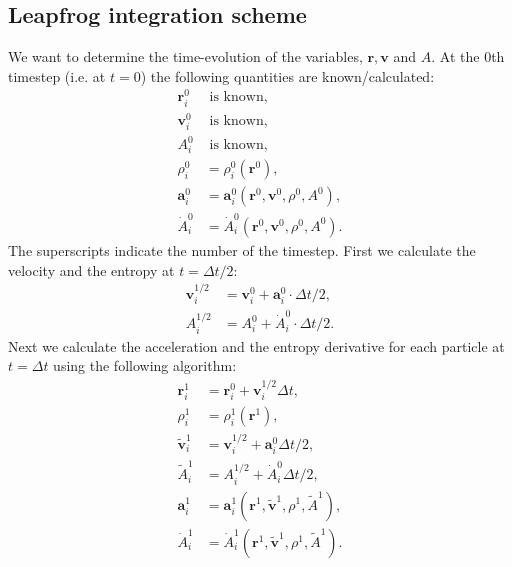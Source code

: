 \documentclass[11pt,a4paper]{article} %
\newcommand{\mb}[1]{\mathbf{#1}}
\begin{document}
\subsection*{Leapfrog integration scheme}
We want to determine the time-evolution of the variables, $\mb{r},\mb{v}$ and $A$. At the 0th timestep (i.e. at $t=0$) the following quantities are known/calculated:
\begin{align*}
\mb{r}_i^0 &\text{ is known},\\
\mb{v}_i^0&\text{ is known},\\
A_i^0&\text{ is known}, \\
\rho_i^0&=\rho_i^0 (\mb{r}^0), \\
\mb{a}_i^0 &= \mb{a}_i^0 (\mb{r}^0,\mb{v}^0,\rho^0 ,A^0 ),\\
\dot{A}_i^0 &= \dot{A}_i^0(\mb{r}^0,\mb{v}^0,\rho^0 ,A^0 ).
\end{align*}
The superscripts indicate the number of the timestep. First we calculate the velocity and the
entropy at $t=\Delta t/2$:
\begin{align*}
\mb{v}_i^{1/2} &= \mb{v}_i^0 + \mb{a}_i^0\cdot  \Delta t/2,\\
A_i^{1/2} &= A_i^{0}+ \dot{A}_i^{0}\cdot \Delta t/2 .
\end{align*}
Next we calculate the acceleration and the entropy derivative for each particle at $t=\Delta t$ using the
following algorithm:
\begin{align*}
\mb{r}_i^1 &= \mb{r}_i^0 + \mb{v}_i^{1/2} \Delta t,\\
\rho_i^1 &= \rho_i^1 (\mb{r}^1),\\
\tilde{\mb{ v}}_i^1 &= \mb{v}_i^{1/2} + \mb{a}_i^{0}  \Delta t/2 ,\\
\tilde{A}_i^1 &= A^{1/2}_i + \dot{A}_{i}^{0}  \Delta t/2,\\
\mb{a}_i^1 &= \mb{a}_i^1 ( \mb{r}^1, \tilde{\mb{v}}^1, \rho^1, \tilde{A}^1 ),\\
\dot{A}_i^1 &= \dot{A}_i^1 (\mb{r}^1 ,\tilde{\mb{ v}}^1, \rho^1, \tilde A^1 ).
\end{align*}
\end{document}
